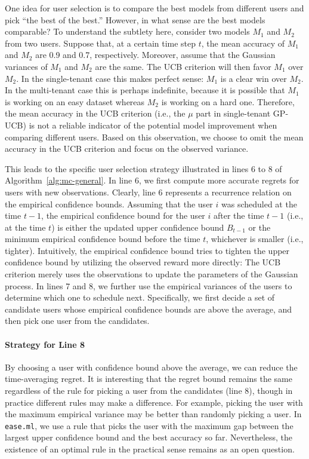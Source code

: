 \documentclass[letterpaper]{vldb}
\newcommand{\eml}{\texttt{ease.ml}\xspace}
\begin{document}
One idea for user selection is to compare the best models from different users and pick ``the best of the best.''
However, in what sense are the best models comparable?
To understand the subtlety here, consider two models $M_1$ and $M_2$ from two users.
Suppose that, at a certain time step $t$, the mean accuracy of $M_1$ and $M_2$ are 0.9 and 0.7, respectively.
Moreover, assume that the Gaussian variances of $M_1$ and $M_2$ are the same.
The UCB criterion will then favor $M_1$ over $M_2$.
In the single-tenant case this makes perfect sense: $M_1$ is a clear win over $M_2$.
In the multi-tenant case this is perhaps indefinite, because it is possible that $M_1$ is working on an easy dataset whereas $M_2$ is working on a hard one.
Therefore, the mean accuracy in the UCB criterion (i.e., the $\mu$ part in single-tenant GP-UCB) is not a reliable indicator of the potential model improvement when comparing different users.
Based on this observation, we choose to omit the mean accuracy in the UCB criterion and focus on the observed variance.

This leads to the specific user selection strategy illustrated in lines 6 to 8 of Algorithm~\ref{alg:mc-general}.
In line 6, we first compute more accurate regrets for users with new observations.
Clearly, line 6 represents a recurrence relation on the empirical confidence bounds.
Assuming that the user $i$ was scheduled at the time $t-1$, the empirical confidence bound for the user $i$ after the time $t-1$ (i.e., at the time $t$) is either the updated upper confidence bound $B_{t-1}$
or the minimum empirical confidence bound before the time $t$, whichever is smaller (i.e., tighter).
Intuitively, the empirical confidence bound tries to tighten the upper confidence bound by utilizing the observed reward more directly: The UCB criterion merely uses the observations to update the parameters of the Gaussian process.
In lines 7 and 8, we further use the empirical variances of the users to determine which one to schedule next.
Specifically, we first decide a set of candidate users whose empirical confidence bounds are above the average, and then pick one user from the candidates.

\vspace{-0.5em}
\paragraph*{Strategy for Line 8}
By choosing a user with confidence bound above the average, we can reduce the time-averaging regret.
It is interesting that the regret bound remains the same regardless of the rule for picking a user from the candidates (line 8), though in practice different rules may make a difference.
For example, picking the user with the maximum empirical variance may be better than randomly picking a user. In \eml, we 
use a rule that picks the user with the maximum
gap between the largest upper confidence bound
and the best accuracy so far.
Nevertheless, the existence of an optimal rule in the practical sense remains as an open question.
\end{document}

